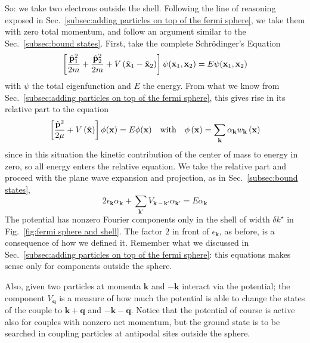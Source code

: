 So: we take two electrons outside the shell. Following the line of reasoning exposed in Sec.~\ref{subsec:adding particles on top of the fermi sphere}, we take them with zero total momentum, and follow an argument similar to the Sec.~\ref{subsec:bound states}. First, take the complete Schrödinger's Equation
\[
	\left[{\frac{\hat{\mathbf{p}}_1^2}{2m} + \frac{\hat{\mathbf{p}}_2^2}{2m} + V \left({\hat{\mathbf{x}}_1 - \hat{\mathbf{x}}_2}\right)}\right] \psi(\mathbf{x}_1,\mathbf{x}_2) = E \psi(\mathbf{x}_1,\mathbf{x}_2)
\]
with $\psi$ the total eigenfunction and $E$ the energy. From what we know from Sec.~\ref{subsec:adding particles on top of the fermi sphere}, this gives rise in its relative part to the equation
\[
	\lrS{\frac{\hat{\mathbf{p}}^2}{2\mu} + V \lrR{\hat{\mathbf{x}}}} \phi(\mathbf{x}) = E \phi(\mathbf{x})
	\qq{with}
	\phi\lrR{\mathbf{x}} = \sum_\mathbf{k} \alpha_\mathbf{k} w_\mathbf{k} \lrR{\mathbf{x}}
\]
since in this situation the kinetic contribution of the center of mass to energy in zero, so all energy enters the relative equation. We take the relative part and proceed with the plane wave expansion and projection, as in Sec.~\ref{subsec:bound states},
\[
	2 \epsilon_\mathbf{k} \alpha_\mathbf{k} + \sum_{\mathbf{k}'} V_{\mathbf{k}-\mathbf{k}'} \alpha_{\mathbf{k}'} = E \alpha_\mathbf{k}
\]
The potential has nonzero Fourier components only in the shell of width $\delta k^\star$ in Fig.~\ref{fig:fermi sphere and shell}. The factor $2$ in front of $\epsilon_\mathbf{k}$, as before, is a consequence of how we defined it. Remember what we discussed in Sec.~\ref{subsec:adding particles on top of the fermi sphere}: this equations makes sense only for components outside the sphere.

Also, given two particles at momenta $\mathbf{k}$ and $-\mathbf{k}$ interact via the potential; the component $V_\mathbf{q}$ is a measure of how much the potential is able to change the states of the couple to $\mathbf{k}+\mathbf{q}$ and $-\mathbf{k}-\mathbf{q}$. Notice that the potential of course is active also for couples with nonzero net momentum, but the ground state is to be searched in coupling particles at antipodal sites outside the sphere.

